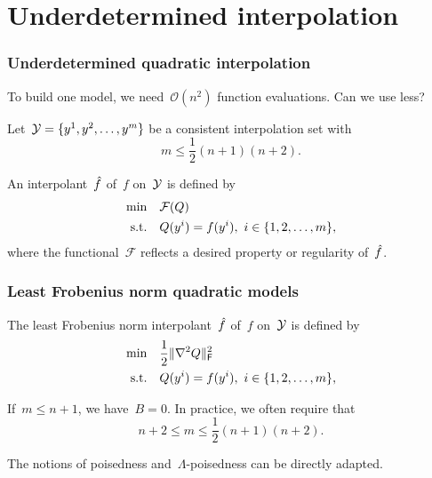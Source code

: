 \documentclass{polyu-presentation}
\newcommand{\obj}{f}
\newcommand{\objm}[1][]{\hat{f}\ifthenelse{\equal{#1}{}}{}{^{#1}}}
\newcommand{\xpt}[1][]{\mathcal{Y}\ifthenelse{\equal{#1}{}}{}{^{#1}}}
\begin{document}
\section{Underdetermined interpolation}

\begin{frame}
    \frametitle{Underdetermined quadratic interpolation}
    
    \begin{block}{}
        To build \alert{one} model, we need~$\mathcal{O}(n^2)$ function evaluations.
        Can we \alert{use less}?
    \end{block}

    \medskip

    Let~$\xpt = \set{y^1, y^2, \dots, y^m}$ be a consistent interpolation set with
    \begin{equation*}
        m \le \frac{1}{2} (n + 1) (n + 2).
    \end{equation*}

    An interpolant~$\objm$ of~$\obj$ on~$\xpt$ is defined by
    \begin{align*}
        \min        & \quad \mathcal{F}(Q)\\
        \text{s.t.} & \quad Q(y^i) = \obj(y^i), ~ i \in \set{1, 2, \dots, m},
    \end{align*}
    where the \alert{functional}~$\mathcal{F}$ reflects a desired \alert{property} or \alert{regularity} of~$\objm$.
\end{frame}

\begin{frame}
    \frametitle{Least Frobenius norm quadratic models}

    The \alert{least Frobenius norm} interpolant~$\objm$ of~$\obj$ on~$\xpt$ is defined by
    \begin{align*}
        \min        & \quad \frac{1}{2} \norm{\nabla^2 Q}_{\mathsf{F}}^2    \\
        \text{s.t.} & \quad Q(y^i) = \obj(y^i), ~ i \in \set{1, 2, \dots, m},
    \end{align*}

    \begin{block}{}
        If~$m \le n + 1$, we have~$B = 0$.
        In practice, we often require that
        \begin{equation*}
            n + 2 \le m \le \frac{1}{2} (n + 1) (n + 2).
        \end{equation*}
    \end{block}

    \medskip

    The notions of \alert{poisedness} and~\alert{$\Lambda$-poisedness} can be directly adapted.
\end{frame}
\end{document}
